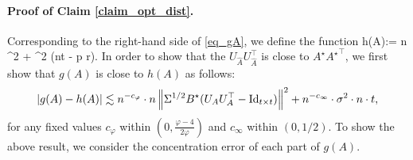 	
	\iffalse
	Second, notice that
	\begin{align*}
			\exarg{\cE}{\cE A^{\top} (AA^{\top})^{+} A \cE^{\top}}
		&= \exarg{\cE}{\sum_{j=1}^t \sum_{k=1}^t \varepsilon^{(j)} A_j^{\top} (AA^{\top})^{+} A_k {\varepsilon^{(k)}}^{\top}} \\
		&= \exarg{\cE}{\sum_{j=1}^t \varepsilon^{(j)} A_j^{\top} (AA^{\top})^{+} A_j {\varepsilon^{(j)}}^{\top}} \\
		&= \sigma^2 \cdot r \cdot \id_{n\times n}.
	\end{align*}
	In the above derivation, the second step used the fact that for any $j\neq k$, $\varepsilon^{(j)}$ and $\varepsilon^{(k)}$ are pairwise independent.
	The third step used the fact that $\sum_{j=1}^t A_j^{\top} (AA^{\top})^{+} A_j = \bigtr{\id_{r\times r}} = r$, and $\ex{\varepsilon^{(j)} {\varepsilon^{(j)}}^{\top}} = \sigma^2 \cdot \id_{n\times n}$.
	Therefore, we have that
	\begin{align*}
		\exarg{\cE}{ \inner{\cW A}{\cE}} = \sigma^2 \cdot r \cdot \bigtr{X(X^{\top} X)^{-1} X^{\top}} =  \sigma^2 \cdot r \cdot \bigtr{ X^{\top}X(X^{\top} X)^{-1}}  = \sigma^2 \cdot r \cdot p.
	\end{align*}
   because $X^\top X$ is a $p\times p$ matrix.	
	Hence the proof is complete.
\fi

	\paragraph{Proof of Claim \ref{claim_opt_dist}.}
	Corresponding to the right-hand side of \eqref{eq_gA}, we define the function
	\be\label{same_hA}h(A):= n ^2 + \sigma^2 (n\cdot t - p \cdot r).\ee
	In order to show that the $U_{\hat{A}}U_{\hat{A}}^\top$ is close to $A^\star {A^\star}^\top$, we first show that $g(A)$ is close to $h(A)$ as follows:
	\begin{align}\label{eq_gA_err}
		{\left| {g(A) - h(A)} \right|} \lesssim  n^{-c_{\varphi}} \cdot n \left\| \Sigma^{1/2} B^{\star} (U_AU_A^{\top} - \operatorname{Id}_{t\times t}) \right\|^2 + n^{-c_{\infty}} \cdot \sigma^2 \cdot n \cdot t,
	\end{align}
	for any fixed values $c_{\varphi}$ within $(0, \frac{\varphi-4}{2\varphi})$ and $c_{\infty}$ within $(0, 1/2)$. 
	To show the above result, we consider the concentration error of each part of $g(A)$.

